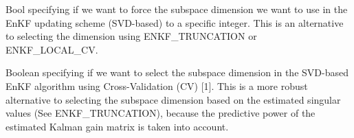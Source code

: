 \documentclass[a4paper,10pt,english]{sphinxmanual}
\begin{document}
\begin{sphinxShadowBox}

Bool specifying if we want to force the subspace dimension we want to use in
the EnKF updating scheme (SVD-based) to a specific integer. This is an
alternative to selecting the dimension using ENKF\_TRUNCATION or ENKF\_LOCAL\_CV.


%
\begin{sphinxVerbatim}[commandchars=\\\{\}]
       
     
              
\end{sphinxVerbatim}
\end{sphinxShadowBox}
\label{\detokenize{keywords/index:enkf-local-cv}}
\begin{sphinxShadowBox}

Boolean specifying if we want to select the subspace dimension in the
SVD-based EnKF algorithm using Cross-Validation (CV) {[}1{]}. This is a more
robust alternative to selecting the subspace dimension based on the estimated
singular values (See ENKF\_TRUNCATION), because the predictive power of the
estimated Kalman gain matrix is taken into account.


%
\begin{sphinxVerbatim}[commandchars=\\\{\}]
      
 
\end{sphinxVerbatim}
\end{sphinxShadowBox}
\label{\detokenize{keywords/index:enkf-pen-press}}
\end{document}
